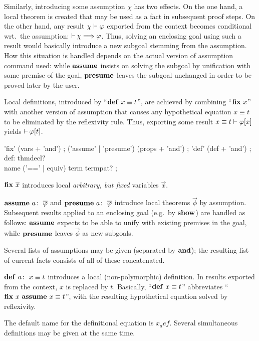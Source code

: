 Similarly, introducing some assumption $\chi$ has two effects.  On the one
hand, a local theorem is created that may be used as a fact in subsequent
proof steps.  On the other hand, any result $\chi \mathrel{\vdash} \varphi$ exported from the
context becomes conditional wrt.\ the assumption: $\mathop{\mathrel{\vdash}}\nolimits \chi \Longrightarrow \varphi$.
Thus, solving an enclosing goal using such a result would basically introduce
a new subgoal stemming from the assumption.  How this situation is handled
depends on the actual version of assumption command used: while ${\mathord{\mathbf{assume}}}$
insists on solving the subgoal by unification with some premise of the goal,
${\mathord{\mathbf{presume}}}$ leaves the subgoal unchanged in order to be proved later by the
user.

Local definitions, introduced by ``$\DEF{}{x \equiv t}$'', are achieved by
combining ``${\mathord{\mathbf{fix}}}~x$'' with another version of assumption that causes any
hypothetical equation $x \equiv t$ to be eliminated by the reflexivity rule.
Thus, exporting some result $x \equiv t \mathrel{\vdash} \varphi[x]$ yields $\mathop{\mathrel{\vdash}}\nolimits \varphi[t]$.


\begin{rail}
  'fix' (vars + 'and')
  ;
  ('assume' | 'presume') (props + 'and')
  ;
  'def' (def + 'and')
  ;
  def: thmdecl? \\ name ('==' | equiv) term termpat?
  ;
\end{rail}

\begin{descr}
  
\item [${\mathord{\mathbf{fix}}}~\overline{x}$] introduces local \emph{arbitrary, but fixed} variables
  $\vec x$.
  
\item [$\ASSUME{a}{\vec\phi}$ and $\PRESUME{a}{\vec\phi}$] introduce local
  theorems $\vec\phi$ by assumption.  Subsequent results applied to an
  enclosing goal (e.g.\ by ${\mathord{\mathbf{show}}}$) are handled as follows: ${\mathord{\mathbf{assume}}}$
  expects to be able to unify with existing premises in the goal, while
  ${\mathord{\mathbf{presume}}}$ leaves $\vec\phi$ as new subgoals.
  
  Several lists of assumptions may be given (separated by
  ${\mathord{\mathbf{and}}}$); the resulting list of current facts consists of all of
  these concatenated.
  
\item [$\DEF{a}{x \equiv t}$] introduces a local (non-polymorphic) definition.
  In results exported from the context, $x$ is replaced by $t$.  Basically,
  ``$\DEF{}{x \equiv t}$'' abbreviates ``$\FIX{x}~\ASSUME{}{x \equiv t}$'',
  with the resulting hypothetical equation solved by reflexivity.
  
  The default name for the definitional equation is $x_def$.  Several
  simultaneous definitions may be given at the same time.

\end{descr}

